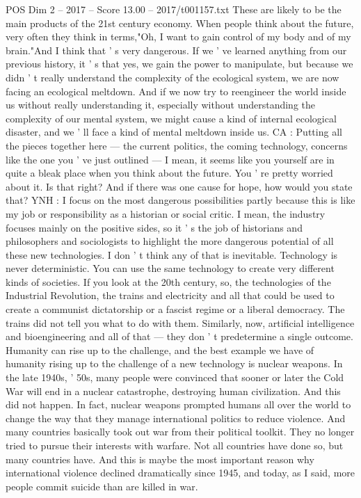 \begin{textsample}{POS Dim 2 – 2017 – Score 13.00 – 2017/t001157.txt}
These are likely to be the main products of the 21st century economy.
When people think about the future, very often they think in terms,"Oh, I want to gain control of my body and of my brain."And I think that ' s very dangerous.
If we ' ve learned anything from our previous history, it ' s that yes, we gain the power to manipulate, but because we didn ' t really understand the complexity of the ecological system, we are now facing an ecological meltdown.
And if we now try to reengineer the world inside us without really understanding it, especially without understanding the complexity of our mental system, we might cause a kind of internal ecological disaster, and we ' ll face a kind of mental meltdown inside us.
CA : Putting all the pieces together here — the current politics, the coming technology, concerns like the one you ' ve just outlined — I mean, it seems like you yourself are in quite a bleak place when you think about the future.
You ' re pretty worried about it.
Is that right?
And if there was one cause for hope, how would you state that?
YNH : I focus on the most dangerous possibilities partly because this is like my job or responsibility as a historian or social critic.
I mean, the industry focuses mainly on the positive sides, so it ' s the job of historians and philosophers and sociologists to highlight the more dangerous potential of all these new technologies.
I don ' t think any of that is inevitable.
Technology is never deterministic.
You can use the same technology to create very different kinds of societies.
If you look at the 20th century, so, the technologies of the Industrial Revolution, the trains and electricity and all that could be used to create a communist dictatorship or a fascist regime or a liberal democracy.
The trains did not tell you what to do with them.
Similarly, now, artificial intelligence and bioengineering and all of that — they don ' t predetermine a single outcome.
Humanity can rise up to the challenge, and the best example we have of humanity rising up to the challenge of a new technology is nuclear weapons.
In the late 1940s, ' 50s, many people were convinced that sooner or later the Cold War will end in a nuclear catastrophe, destroying human civilization.
And this did not happen.
In fact, nuclear weapons prompted humans all over the world to change the way that they manage international politics to reduce violence.
And many countries basically took out war from their political toolkit.
They no longer tried to pursue their interests with warfare.
Not all countries have done so, but many countries have.
And this is maybe the most important reason why international violence declined dramatically since 1945, and today, as I said, more people commit suicide than are killed in war.

\end{textsample}
